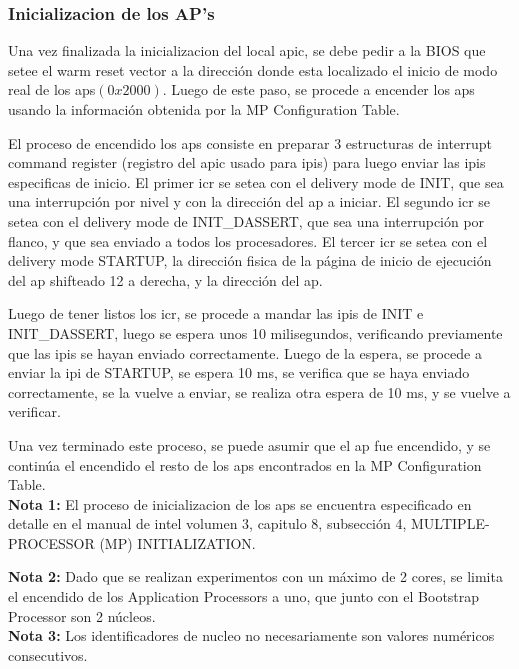 \subsubsection{Inicializacion de los AP's}

Una vez finalizada la inicializacion del local apic, se debe pedir a la BIOS que setee el warm reset vector a la dirección donde esta localizado el inicio de modo real de los aps$(0x2000)$. Luego de este paso, se procede a encender los aps usando la información obtenida por la MP Configuration Table.

El proceso de encendido los aps consiste en preparar 3 estructuras de interrupt command register (registro del apic usado para ipis) para luego enviar las ipis especificas de inicio. El primer icr se setea con el delivery mode de INIT, que sea una interrupción por nivel y con la dirección del ap a iniciar. El segundo icr se setea con el delivery mode de INIT\_DASSERT, que sea una interrupción por flanco, y que sea enviado a todos los procesadores. El tercer icr se setea con el delivery mode STARTUP, la dirección fisica de la página de inicio de ejecución del ap shifteado 12 a derecha, y la dirección del ap.

Luego de tener listos los icr, se procede a mandar las ipis de INIT e INIT\_DASSERT, luego se espera unos 10 milisegundos, verificando previamente que las ipis se hayan enviado correctamente. Luego de la espera, se procede a enviar la ipi de STARTUP, se espera 10 ms, se verifica que se haya enviado correctamente, se la vuelve a enviar, se realiza otra espera de 10 ms, y se vuelve a verificar.

Una vez terminado este proceso, se puede asumir que el ap fue encendido, y se continúa el encendido el resto de los aps encontrados en la MP Configuration Table.\\

\textbf{Nota 1: } El proceso de inicializacion de los aps se encuentra especificado en detalle en el manual de intel volumen 3, capitulo 8, subsección 4, MULTIPLE-PROCESSOR (MP) INITIALIZATION.

\textbf{Nota 2: } Dado que se realizan experimentos con un máximo de 2 cores, se limita el encendido de los Application Processors a uno, que junto con el Bootstrap Processor son 2 núcleos.\\

\textbf{Nota 3: } Los identificadores de nucleo no necesariamente son valores numéricos consecutivos.